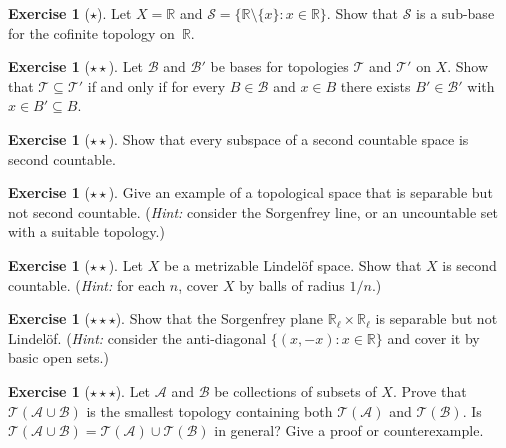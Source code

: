 \documentclass[11pt,a4paper,twoside]{book}
\theoremstyle{remark}
\theoremstyle{definition}
\newtheorem{exerciseplain}[theorem]{Exercise}
\theoremstyle{definition}
\newenvironment{exercise}[1][]{%
  \begin{exerciseplain}[#1]
}{%
  \end{exerciseplain}
}
\begin{document}
\begin{exercise}[$\star$]
\label{exer:subbase-finite-complement}
Let $X=\mathbb{R}$ and $\mathscr{S}=\{\mathbb{R}\setminus\{x\}:x\in\mathbb{R}\}$.
Show that $\mathscr{S}$ is a sub-base for the cofinite topology on~$\mathbb{R}$.
\end{exercise}

\begin{exercise}[$\star\star$]
\label{exer:base-comparison-lemma}
Let $\mathscr{B}$ and $\mathscr{B}'$ be bases for topologies $\mathscr{T}$ and
$\mathscr{T}'$ on $X$.  Show that $\mathscr{T}\subseteq\mathscr{T}'$ if and
only if for every $B\in\mathscr{B}$ and $x\in B$ there exists
$B'\in\mathscr{B}'$ with $x\in B'\subseteq B$.
\end{exercise}

\begin{exercise}[$\star\star$]
\label{exer:second-countable-subspace}
Show that every subspace of a second countable space is second countable.
\end{exercise}

\begin{exercise}[$\star\star$]
\label{exer:separable-not-2nd-countable}
Give an example of a topological space that is separable but not second
countable.  (\textit{Hint:} consider the Sorgenfrey line, or an uncountable set
with a suitable topology.)
\end{exercise}

\begin{exercise}[$\star\star$]
\label{exer:lindelof-metrizable}
Let $X$ be a metrizable Lindel\"{o}f space.  Show that $X$ is second countable.
(\textit{Hint:} for each $n$, cover $X$ by balls of radius $1/n$.)
\end{exercise}

\begin{exercise}[$\star\star\star$]
\label{exer:sorgenfrey-product}
Show that the Sorgenfrey plane $\mathbb{R}_\ell\times\mathbb{R}_\ell$ is
separable but not Lindel\"{o}f.  (\textit{Hint:} consider the anti-diagonal
$\{(x,-x):x\in\mathbb{R}\}$ and cover it by basic open sets.)
\end{exercise}

\begin{exercise}[$\star\star\star$]
\label{exer:generated-topology-lattice}
Let $\mathscr{A}$ and $\mathscr{B}$ be collections of subsets of $X$.  Prove
that $\mathscr{T}(\mathscr{A}\cup\mathscr{B})$ is the smallest topology
containing both $\mathscr{T}(\mathscr{A})$ and $\mathscr{T}(\mathscr{B})$.  Is
$\mathscr{T}(\mathscr{A}\cup\mathscr{B})=
\mathscr{T}(\mathscr{A})\cup\mathscr{T}(\mathscr{B})$ in general?  Give a
proof or counterexample.
\end{exercise}
\end{document}
